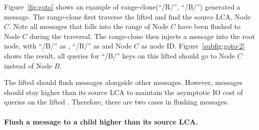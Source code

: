 Figure~\ref{fig:goto} shows an example of range-clone(``/R/'', ``/B/'')
generated a \goto message.
The range-clone first traverse the lifted \bedag and find the source LCA, Node
$C$.
Note all messages that falls into the range of Node $C$ have been flushed to
Node $C$ during the traversal.
The range-clone then injects a \goto message into the root node, with ``/B/''
as \dpre, ``/R/'' as \spre and Node $C$ as node ID.
Figure~\ref{subfig:goto-2} shows the result, all queries for ``/B/'' keys on
this lifted \bedag should go to Node $C$ instead of Node $B$.

The lifted \bedag should flush \goto messages alongside other messages.
However, \goto messages should stay higher than its source LCA to maintain the
asymptotic IO cost of queries on the lifted \bedag.
Therefore, there are two cases in flushing \goto messages.

\paragraph{Flush a \goto message to a child higher than its source LCA.}

